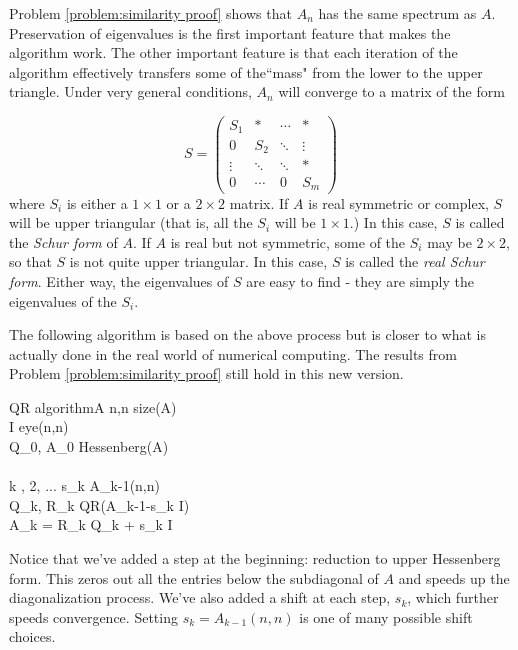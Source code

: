 Problem \ref{problem:similarity proof} shows that $A_n$ has the same spectrum as $A$. Preservation of eigenvalues is the first important feature that makes the algorithm work. The other important feature is that each iteration of the algorithm effectively transfers some of the``mass" from the lower to the upper triangle. Under very general conditions, $A_n$ will converge to a matrix of the form

\begin{equation}
\label{eq:Schur form}
S = 
     \begin{pmatrix}
          S_1 &* & \cdots & * \\
           0     &S_2  &  \ddots & \vdots \\
           \vdots  & \ddots & \ddots & *  \\
           0 & \cdots & 0 & S_m
    \end{pmatrix}
\end{equation}
where $S_i$ is either a $1 \times 1$ or a $2 \times 2$ matrix. If $A$ is real symmetric or complex, $S$ will be upper triangular (that is, all the $S_i$ will be $1 \times 1$.) In this case, $S$ is called the \emph{Schur form} of $A$. If $A$ is real but not symmetric, some of the $S_i$ may be $2 \times 2$, so that $S$ is not quite upper triangular. In this case, $S$ is called the \emph{real Schur form}. Either way, the eigenvalues of $S$ are easy to find - they are simply the eigenvalues of the $S_i$.

The following algorithm is based on the above process but is closer to what is actually done in the real world of numerical computing. The results from Problem \ref{problem:similarity proof} still hold in this new version.

\begin{pseudo}{QR algorithm}{A}
\label{Alg:QR algorithm}
n,n \GETS size(A)\\
I \GETS eye(n,n)\\
 Q_0, A_0 \GETS Hessenberg(A)\\
\\
\FOR k , 2, ... \DO
\BEGIN
	s_k \GETS A_{k-1}(n,n)\\
	Q_k, R_k \GETS QR(A_{k-1}-s_k I)\\
	A_k = R_k Q_k + s_k I
\END
\end{pseudo}

Notice that we've added a step at the beginning: reduction to upper Hessenberg form. This zeros out all the entries below the subdiagonal of $A$ and speeds up the diagonalization process. We've also added a shift at each step, $s_k$, which further speeds convergence. Setting $s_k = A_{k-1}(n,n)$ is one of many possible shift choices.

